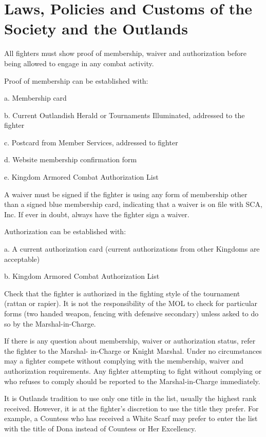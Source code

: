 \documentclass{article}
\begin{document}
\section{Laws, Policies and Customs of the Society and the Outlands}
All fighters must show proof of membership, waiver and authorization
before being allowed to engage in any combat activity.


Proof of membership can be established with:


a. Membership card

b. Current Outlandish Herald or Tournaments Illuminated, addressed to the fighter

c. Postcard from Member Services, addressed to fighter

d. Website membership confirmation form

e. Kingdom Armored Combat Authorization List

A waiver must be signed if the fighter is using any form of membership other than a
signed blue membership card, indicating that a waiver is on file with SCA, Inc. If ever in doubt, always have the
fighter sign a waiver.

Authorization can be established with:

a. A current authorization card (current authorizations from other Kingdoms are acceptable)

b. Kingdom Armored Combat Authorization List



Check that the fighter is authorized in the fighting style of the tournament (rattan or rapier). It is not the
responsibility of the MOL to check for particular forms (two handed weapon, fencing with defensive
secondary) unless asked to do so by the Marshal-in-Charge.


If there is any question about membership, waiver or authorization status, refer the fighter to the Marshal-
in-Charge or Knight Marshal. Under no circumstances may a fighter compete without complying with the
membership, waiver and authorization requirements. Any fighter attempting to fight without complying
or who refuses to comply should be reported to the Marshal-in-Charge immediately.

It is Outlands tradition to use only one title in the list, usually the highest rank received. However, it is at
the fighter’s discretion to use the title they prefer. For example, a Countess who has received a White
Scarf may prefer to enter the list with the title of Dona instead of Countess or Her Excellency.
\end{document}
